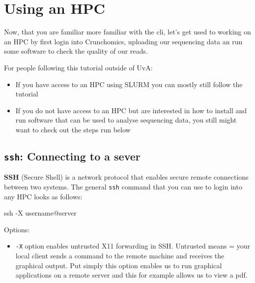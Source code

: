 \documentclass[
  letterpaper,
  DIV=11,
  numbers=noendperiod]{scrreprt}
\author{}
\date{}
\newenvironment{Shaded}{}{}
\newcommand{\AttributeTok}[1]{\textcolor[rgb]{0.84,0.23,0.29}{#1}}
\newcommand{\FunctionTok}[1]{\textcolor[rgb]{0.44,0.26,0.76}{#1}}
\newcommand{\NormalTok}[1]{\textcolor[rgb]{0.14,0.16,0.18}{#1}}
\providecommand{\tightlist}{%
  \setlength{\itemsep}{0pt}\setlength{\parskip}{0pt}}\usepackage{longtable,booktabs,array}
\renewcommand*\contentsname{Table of contents}
\newcommand\contentsname{Table of contents}
\begin{document}

\renewcommand*\contentsname{Table of contents}
{
\hypersetup{linkcolor=}
\setcounter{tocdepth}{2}
\tableofcontents
}
\chapter{Using an HPC}\label{using-an-hpc}

Now, that you are familiar more familiar with the cli, let's get used to
working on an HPC by first login into Crunchomics, uploading our
sequencing data an run some software to check the quality of our reads.

For people following this tutorial outside of UvA:

\begin{itemize}
\item
  If you have access to an HPC using SLURM you can mostly still follow
  the tutorial
\item
  If you do not have access to an HPC but are interested in how to
  install and run software that can be used to analyse sequencing data,
  you still might want to check out the steps run below
\end{itemize}

\section{\texorpdfstring{\texttt{ssh}: Connecting to a
sever}{ssh: Connecting to a sever}}\label{ssh-connecting-to-a-sever}

\textbf{SSH} (Secure Shell) is a network protocol that enables secure
remote connections between two systems. The general \texttt{ssh} command
that you can use to login into any HPC looks as follows:

\begin{Shaded}
\begin{Highlighting}[]
\FunctionTok{ssh} \AttributeTok{{-}X}\NormalTok{ username@server}
\end{Highlighting}
\end{Shaded}

Options:

\begin{itemize}
\tightlist
\item
  \texttt{-X} option enables untrusted X11 forwarding in SSH. Untrusted
  means = your local client sends a command to the remote machine and
  receives the graphical output. Put simply this option enables us to
  run graphical applications on a remote server and this for example
  allows us to view a pdf.
\end{itemize}
\end{document}
